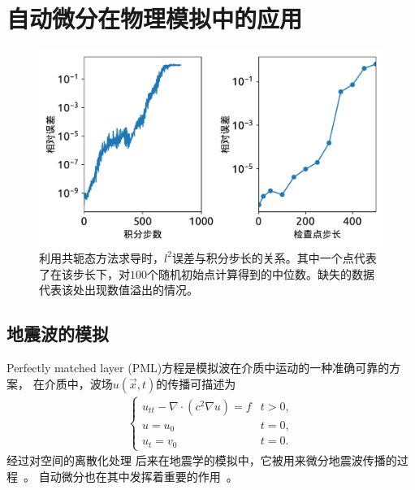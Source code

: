 \documentclass[A4,twoside,fontset=ubuntu,UTF8]{ctexart}
\begin{document}
\section{自动微分在物理模拟中的应用}\label{sec:applications}

\begin{figure}[t]
\centering
\includegraphics[width=0.6\columnwidth]{./fig2.pdf}
    \caption{利用共轭态方法求导时，$l^2$误差与积分步长的关系。其中一个点代表了在该步长下，对$100$个随机初始点计算得到的中位数。缺失的数据代表该处出现数值溢出的情况。\label{fig:neuralode-error}} 
\end{figure}


\baselineskip
\subsection{地震波的模拟}
Perfectly matched layer (PML)方程是模拟波在介质中运动的一种准确可靠的方案，
在介质中，波场$u(\vec x, t)$的传播可描述为
\begin{align}
    \begin{cases}
    u_{tt} - \nabla\cdot(c^2\nabla u) = f & t>0,\\
    u = u_0 & t=0,\\
    u_t = v_0 & t=0.
    \end{cases}
\end{align}
经过对空间的离散化处理
后来在地震学的模拟中，它被用来微分地震波传播的过程~\cite{Symes2007}。
自动微分也在其中发挥着重要的作用~\cite{Zhu2020}。
~\cite{Grote2010}

\baselineskip
\end{document}

